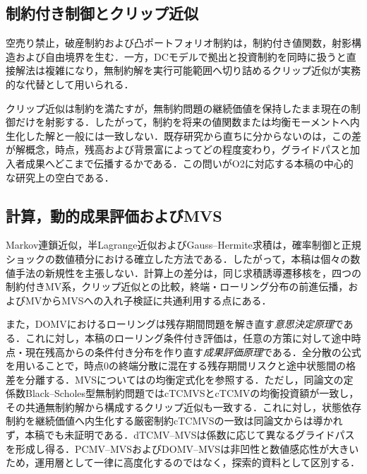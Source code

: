 \documentclass[10pt,a4paper]{article}
\theoremstyle{plain}
\theoremstyle{definition}
\begin{document}
\subsection{制約付き制御とクリップ近似}

空売り禁止，破産制約および凸ポートフォリオ制約は，制約付き値関数，射影構造および自由境界を生む\citep{LiZhouLim2002,LiXu2015,BensoussanWongYamYung2014,GuanLiZhouZhou2022}．一方，DCモデルで拠出と投資制約を同時に扱うと直接解法は複雑になり，無制約解を実行可能範囲へ切り詰めるクリップ近似が実務的な代替として用いられる\citep{DiGiacintoFedericoGozziVigna2014,FerreiraMoriciVigna2025}．

クリップ近似は制約を満たすが，無制約問題の継続価値を保持したまま現在の制御だけを射影する．したがって，制約を将来の値関数または均衡モーメントへ内生化した解と一般には一致しない．既存研究から直ちに分からないのは，この差が解概念，時点，残高および背景富によってどの程度変わり，グライドパスと加入者成果へどこまで伝播するかである．この問いがO2に対応する本稿の中心的な研究上の空白である．

\subsection{計算，動的成果評価およびMVS}

Markov連鎖近似，半Lagrange近似およびGauss--Hermite求積は，確率制御と正規ショックの数値積分における確立した方法である\citep{KushnerDupuis2001,FalconeFerretti2014,AbramowitzStegun1972,Judd1998}．したがって，本稿は個々の数値手法の新規性を主張しない．計算上の差分は，同じ求積誘導遷移核を，四つの制約付きMV系，クリップ近似との比較，終端・ローリング分布の前進伝播，およびMVからMVSへの入れ子検証に共通利用する点にある．

また，DOMVにおけるローリングは残存期間問題を解き直す\emph{意思決定原理}である．これに対し，本稿のローリング条件付き評価は，任意の方策に対して途中時点・現在残高からの条件付き分布を作り直す\emph{成果評価原理}である．全分散の公式を用いることで，時点0の終端分散に混在する残存期間リスクと途中状態間の格差を分離する．MVSについては\citet{MuTianYang2019}の均衡定式化を参照する．ただし，同論文の定係数Black--Scholes型無制約問題ではcTCMVSとcTCMVの均衡投資額が一致し，その共通無制約解から構成するクリップ近似も一致する．これに対し，状態依存制約を継続価値へ内生化する厳密制約cTCMVSの一致は同論文からは導かれず，本稿でも未証明である．dTCMV--MVSは係数に応じて異なるグライドパスを形成し得る．PCMV--MVSおよびDOMV--MVSは非凹性と数値感応性が大きいため，運用層として一律に高度化するのではなく，探索的資料として区別する．
\end{document}
